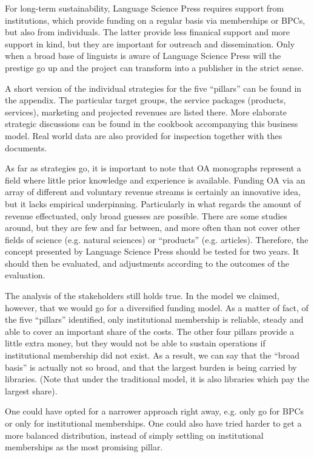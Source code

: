 \documentclass[nonflat,smallfont
]{langsci/langscibook}
\newcommand{\evaluation}[1]{
  \renewcommand{\tblslinecolour}{lsLightOrange}
  \tblssy{receipt}{Evaluation}{\vspace*{-5mm}#1}
}
\newcommand{\othersolutions}[1]{
  \renewcommand{\tblslinecolour}{lsDarkGreenOne}
  \tblssy{more}{Other solutions}{\vspace*{-5mm}#1}
}
\renewcommand{\tblssy}[4][black!12]{%
  \renewcommand{\langscisymbol}{#2}\renewcommand{\tblsboxcolor}{#1}
  \begin{mdframed}[style=yellowexercise,frametitle={#3}]
    #4
  \end{mdframed}
}
\begin{document}
{For long-term sustainability, Language Science Press requires support from institutions, which provide funding on a regular basis via memberships or BPCs, but also from individuals. The latter provide less finanical support and more support in kind, but they are important for outreach and dissemination. Only when a broad base of linguists is aware of Language Science Press will the prestige go up and the project can transform into a publisher in the strict sense. 

A short version of the individual strategies for the five ``pillars'' can be found in the appendix. The particular target groups, the service packages (products, services), marketing and projected revenues are listed there. More elaborate strategic discussions can be found in the cookbook accompanying this business model. Real world data are also provided for inspection together with thes documents. 

As far as strategies go, it is important to note that OA monographs represent a field where little prior knowledge and experience is available. Funding OA via an array of different and voluntary revenue streams is certainly an innovative idea, but it lacks empirical underpinning. Particularly in what regards the amount of revenue effectuated, only broad guesses are possible. There are some studies around, but they are few and far between, and more often than not cover other fields of science (e.g. natural sciences) or ``products'' (e.g. articles). Therefore, the concept presented by Language Science Press should be tested for two years. It should then be evaluated, and adjustments according to the outcomes of the evaluation. 
}
\evaluation{
The analysis of the stakeholders still holds true. In the model we claimed, however, that we would go for a diversified funding model. As a matter of fact, of the five ``pillars'' identified, only institutional membership is reliable, steady and able to cover an important share of the costs. The other four pillars provide a little extra money, but they would not be able to sustain operations if institutional membership did not exist. As a result, we can say that the ``broad basis'' is actually not so broad, and that the largest burden is being carried by libraries. (Note that under the traditional model, it is also libraries which pay the largest share).
}

\othersolutions{
One could have opted for a narrower approach right away, e.g. only go for BPCs or only for institutional memberships. One could also have tried harder to get a more balanced distribution, instead of simply settling on institutional memberships as the most promising pillar. 
}
\end{document}
